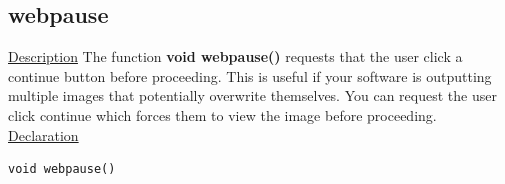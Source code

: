 \subsection{webpause}
\underline{Description} The function \textbf{void webpause()} requests that the user click a continue button before proceeding. This is useful if your 
software is outputting multiple images that potentially overwrite themselves. You can request the user click continue which forces them to view the
image before proceeding.
\\
\underline{Declaration}
\begin{verbatim}
void webpause()
\end{verbatim}

\newpage
